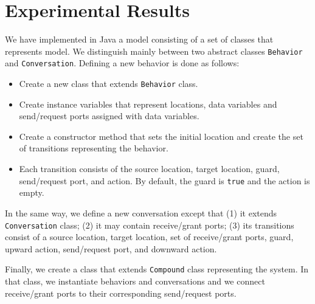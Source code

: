 \section{Experimental Results}
\label{sec:java}
We have implemented in Java a model consisting of a set of classes that represents {\compmodel} model. We distinguish mainly between two abstract classes \texttt{Behavior} and \texttt{Conversation}. Defining a new behavior is done as follows:
\begin{itemize}
\item Create a new class that extends \texttt{Behavior} class. 
\item Create instance variables that represent locations, data variables and send/request ports assigned with data variables.
\item Create a constructor method that sets the initial location and create the set of transitions representing the behavior. 
\item Each transition consists of the source location, target location, guard, send/request port, and action. By default, the guard is \texttt{true} and the action is empty.  
\end{itemize}
In the same way, we define a new conversation except that (1) it extends \texttt{Conversation} class; (2) it may contain receive/grant ports; (3) its transitions consist of a source location, target location, set of receive/grant ports, guard, upward action, send/request port, and downward action.

Finally, we create a class that extends \texttt{Compound} class representing the system. In that class, we instantiate behaviors and conversations and we connect receive/grant ports to their corresponding send/request ports. 


